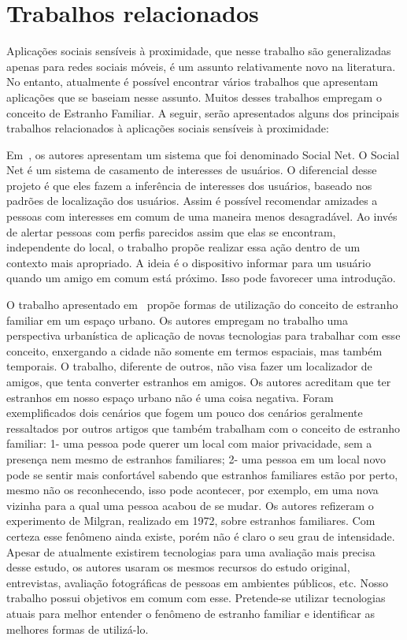 \section{Trabalhos relacionados}
\label{sec:related-work}

Aplicações sociais sensíveis à proximidade, que nesse trabalho
são generalizadas apenas para redes sociais móveis, é um assunto
relativamente novo na literatura. No entanto, atualmente é possível
encontrar vários trabalhos que apresentam aplicações que se baseiam
nesse assunto. Muitos desses trabalhos empregam o conceito de Estranho
Familiar. A seguir, serão apresentados alguns dos principais trabalhos
relacionados à aplicações sociais sensíveis à proximidade:

Em~\cite{SocialNet}, os autores
apresentam um sistema que foi denominado Social Net. O Social Net é um
sistema de casamento de interesses de usuários. O diferencial desse
projeto é que eles fazem a inferência de interesses dos usuários,
baseado nos padrões de localização dos usuários. Assim é possível
recomendar amizades a pessoas com interesses em comum de uma maneira
menos desagradável. Ao invés de alertar pessoas com perfis parecidos
assim que elas se encontram, independente do local, o trabalho propõe
realizar essa ação dentro de um contexto mais apropriado. A ideia é o
dispositivo informar para um usuário quando um amigo em comum está
próximo. Isso pode favorecer uma introdução.

O trabalho apresentado em~\cite{FamiliarStranger} propõe formas de
utilização do conceito de estranho familiar em um espaço urbano. Os
autores empregam no trabalho uma perspectiva urbanística de aplicação de
novas tecnologias para trabalhar com esse conceito, enxergando a cidade
não somente em termos espaciais, mas também temporais. O trabalho,
diferente de outros, não visa fazer um localizador de amigos, que tenta
converter estranhos em amigos. Os autores acreditam que ter estranhos em
nosso espaço urbano não é uma coisa negativa. Foram exemplificados dois
cenários que fogem um pouco dos cenários geralmente ressaltados por
outros artigos que também trabalham com o conceito de estranho familiar:
1- uma pessoa pode querer um local com maior privacidade, sem a presença
nem mesmo de estranhos familiares; 2- uma  pessoa em um local novo pode
se sentir mais confortável sabendo que estranhos familiares estão por
perto, mesmo não os reconhecendo, isso pode acontecer, por exemplo, em
uma nova vizinha para a  qual uma pessoa acabou de se mudar. Os autores
refizeram o experimento de Milgran, realizado em 1972, sobre estranhos
familiares. Com certeza esse fenômeno ainda existe, porém não é claro o
seu grau de intensidade. Apesar de atualmente existirem tecnologias para
uma avaliação mais precisa desse estudo, os autores usaram os mesmos
recursos do estudo original, entrevistas, avaliação fotográficas de
pessoas em ambientes públicos, etc. Nosso trabalho possui objetivos em
comum com esse. Pretende-se utilizar tecnologias atuais para melhor
entender o fenômeno de estranho familiar e identificar as melhores
formas de utilizá-lo.

